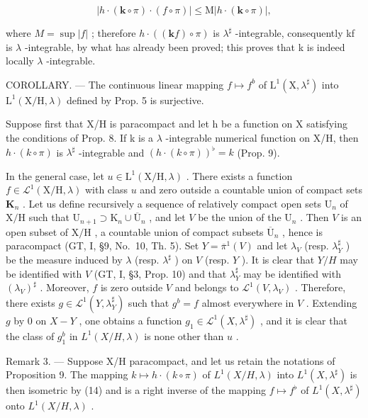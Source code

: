 \[
\left| h \cdot (\mathbf {k} \circ \pi) \cdot (f \circ \pi) \right| \leqslant \mathrm{M} \left| h \cdot (\mathbf {k} \circ \pi) \right|,
\]

where \(M = \sup |f|\) ; therefore \(h \cdot ((\mathbf{k}f) \circ \pi)\) is \(\lambda^{\sharp}\) -integrable, consequently kf is \(\lambda\) -integrable, by what has already been proved; this proves that k is indeed locally \(\lambda\) -integrable.

COROLLARY. --- The continuous linear mapping \(f \mapsto f^{b}\) of \(\mathrm{L}^{1}(\mathrm{X}, \lambda^{\sharp})\) into \(\mathrm{L}^{1}(\mathrm{X}/\mathrm{H}, \lambda)\) defined by Prop. 5 is surjective.

Suppose first that X/H is paracompact and let h be a function on X satisfying the conditions of Prop. 8. If k is a \(\lambda\) -integrable numerical function on X/H, then \(h \cdot (k \circ \pi)\) is \(\lambda^{\sharp}\) -integrable and \((h \cdot (k \circ \pi))^{\flat} = k\) (Prop. 9).

In the general case, let \(u \in \mathrm{L}^1(\mathrm{X/H},\lambda)\) . There exists a function \(f \in \mathcal{L}^1(\mathrm{X/H},\lambda)\) with class \(u\) and zero outside a countable union of compact sets \(\mathbf{K}_n\) . Let us define recursively a sequence of relatively compact open sets \(\mathrm{U}_n\) of \(\mathrm{X/H}\) such that \(\mathrm{U}_{n+1} \supset \mathrm{K}_n \cup \overline{\mathrm{U}}_n\) , and let \(V\) be the union of the \(\mathrm{U}_n\) . Then \(V\) is an open subset of \(\mathrm{X/H}\) , a countable union of compact subsets \(\overline{\mathrm{U}}_n\) , hence is paracompact (GT, I, §9, No.~10, Th. 5). Set \(Y = \overline{\pi}^1(V)\) and let \(\lambda_V\) (resp. \(\lambda_Y^\sharp\) ) be the measure induced by \(\lambda\) (resp. \(\lambda^\sharp\) ) on \(V\) (resp. \(Y\) ). It is clear that \(Y/H\) may be identified with \(V\) (GT, I, §3, Prop. 10) and that \(\lambda_Y^\sharp\) may be identified with \((\lambda_V)^{\sharp}\) . Moreover, \(f\) is zero outside \(V\) and belongs to \(\mathcal{L}^1(V,\lambda_V)\) . Therefore, there exists \(g \in \mathcal{L}^1(Y,\lambda_Y^\sharp)\) such that \(g^b = f\) almost everywhere in \(V\) . Extending \(g\) by 0 on \(X - Y\) , one obtains a function \(g_1 \in \mathcal{L}^1(X,\lambda^\sharp)\) , and it is clear that the class of \(g_1^b\) in \(L^1(X/H,\lambda)\) is none other than \(u\) .

Remark 3. --- Suppose X/H paracompact, and let us retain the notations of Proposition 9. The mapping \(k \mapsto h \cdot (k \circ \pi)\) of \(L^1(X/H, \lambda)\) into \(L^1(X, \lambda^\sharp)\) is then isometric by (14) and is a right inverse of the mapping \(f \mapsto f^\flat\) of \(L^1(X, \lambda^\sharp)\) onto \(L^1(X/H, \lambda)\) .

